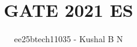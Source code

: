 \documentclass[journal]{IEEEtran}
\begin{document}

\vspace{3cm}


\title{GATE 2021 ES}
\author{ee25btech11035 - Kushal B N}
\maketitle
{\let\newpage\relax\maketitle}

\renewcommand{\thetable}{\theenumi}
\setlength{\intextsep}{10pt} %
\end{document}

